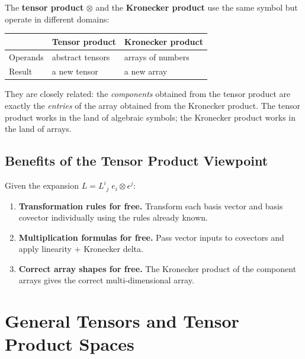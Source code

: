 \documentclass[12pt, a4paper]{report}
\theoremstyle{definition}
\theoremstyle{plain}
\theoremstyle{remark}
\begin{document}
The \textbf{tensor product} $\otimes$ and the \textbf{Kronecker product} use the
same symbol but operate in different domains:

\begin{center}
\renewcommand{\arraystretch}{1.3}
\begin{tabular}{lll}
    \toprule
    & \textbf{Tensor product} & \textbf{Kronecker product} \\
    \midrule
    Operands & abstract tensors & arrays of numbers \\
    Result   & a new tensor     & a new array \\
    \bottomrule
\end{tabular}
\end{center}

\noindent They are closely related: the \emph{components} obtained from the tensor
product are exactly the \emph{entries} of the array obtained from the Kronecker
product.  The tensor product works in the land of algebraic symbols; the Kronecker
product works in the land of arrays.

\section{Benefits of the Tensor Product Viewpoint}

Given the expansion $L = L^{i}{}_{j}\;e_i \otimes \epsilon^{j}$:

\begin{enumerate}[nosep]
    \item \textbf{Transformation rules for free.}  Transform each basis vector and
          basis covector individually using the rules already known.
    \item \textbf{Multiplication formulas for free.}  Pass vector inputs to
          covectors and apply linearity + Kronecker delta.
    \item \textbf{Correct array shapes for free.}  The Kronecker product of the
          component arrays gives the correct multi-dimensional array.
\end{enumerate}

\chapter{General Tensors and Tensor Product Spaces}\label{ch:general-tensors}
\end{document}
